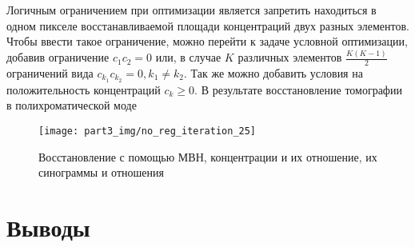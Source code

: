 Логичным ограничением при оптимизации является запретить находиться в одном пикселе восстанавливаемой площади концентраций двух разных элементов.
Чтобы ввести такое ограничение, можно перейти к задаче условной оптимизации, добавив ограничение $c_1 c_2 = 0$ или, в случае $K$ различных элементов $\frac{ K (K - 1) } { 2 }$ ограничений вида $c_{k_1} c_{k_2} = 0, k_1 \neq k_2$.
Так же можно добавить условия на положительность концентраций $c_k \geq 0$.
В результате восстановление томографии в полихроматической моде


\begin{figure}
  \centering
  \texttt{[image: part3\_img/no\_reg\_iteration\_25]}
  \caption{Восстановление с помощью МВН, концентрации и их отношение, их синограммы и отношения}
  \label{fig:wrart_noreg_25}
\end{figure}


\section{Выводы} \label{sect_3_3}
